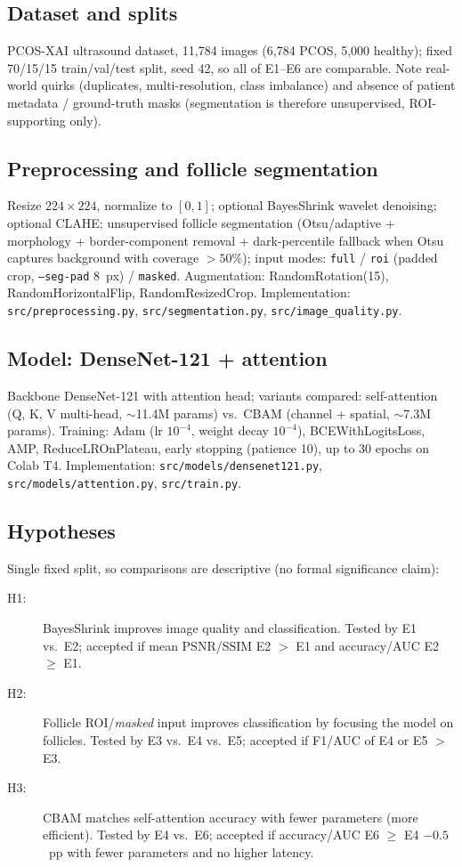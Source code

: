 \documentclass[a4paper,fleqn]{cas-sc}
\begin{document}
\subsection{Dataset and splits}\label{sec:dataset}
PCOS-XAI ultrasound dataset, 11,784 images (6,784 PCOS, 5,000 healthy); fixed 70/15/15 train/val/test split, seed 42, so all of E1--E6 are comparable. Note real-world quirks (duplicates, multi-resolution, class imbalance) and absence of patient metadata / ground-truth masks (segmentation is therefore unsupervised, ROI-supporting only).

\subsection{Preprocessing and follicle segmentation}\label{sec:preproc}
Resize $224\times224$, normalize to $[0,1]$; optional BayesShrink wavelet denoising; optional CLAHE; unsupervised follicle segmentation (Otsu/adaptive + morphology + border-component removal + dark-percentile fallback when Otsu captures background with coverage $>50\%$); input modes: \texttt{full} / \texttt{roi} (padded crop, \texttt{--seg-pad} 8~px) / \texttt{masked}. Augmentation: RandomRotation(15), RandomHorizontalFlip, RandomResizedCrop. Implementation: \texttt{src/preprocessing.py}, \texttt{src/segmentation.py}, \texttt{src/image\_quality.py}.

\subsection{Model: DenseNet-121 + attention}\label{sec:model}
Backbone DenseNet-121 with attention head; variants compared: self-attention (Q, K, V multi-head, $\sim$11.4M params) vs.\ CBAM (channel + spatial, $\sim$7.3M params). Training: Adam (lr $10^{-4}$, weight decay $10^{-4}$), BCEWithLogitsLoss, AMP, ReduceLROnPlateau, early stopping (patience 10), up to 30 epochs on Colab T4. Implementation: \texttt{src/models/densenet121.py}, \texttt{src/models/attention.py}, \texttt{src/train.py}.

\subsection{Hypotheses}\label{sec:hypotheses}
Single fixed split, so comparisons are descriptive (no formal significance claim):
\begin{description}
\item[H1:] BayesShrink improves image quality and classification. Tested by E1 vs.\ E2; accepted if mean PSNR/SSIM E2 $>$ E1 and accuracy/AUC E2 $\ge$ E1.
\item[H2:] Follicle ROI/\textit{masked} input improves classification by focusing the model on follicles. Tested by E3 vs.\ E4 vs.\ E5; accepted if F1/AUC of E4 or E5 $>$ E3.
\item[H3:] CBAM matches self-attention accuracy with fewer parameters (more efficient). Tested by E4 vs.\ E6; accepted if accuracy/AUC E6 $\ge$ E4 $-0.5$~pp with fewer parameters and no higher latency.
\end{description}
\end{document}
